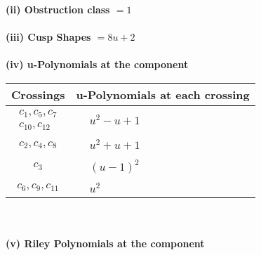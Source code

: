 \documentclass[1p]{elsarticle_modified}
\theoremstyle{definition}
\begin{document}
\flushleft \textbf{(ii) Obstruction class $= 1$}\\~\\
\flushleft \textbf{(iii) Cusp Shapes $= 8 u+2$}\\~\\
\newpage\renewcommand{\arraystretch}{1}
\flushleft \textbf{(iv) u-Polynomials at the component}\newline \\
\begin{tabular}{m{50pt}|m{274pt}}
Crossings & \hspace{64pt}u-Polynomials at each crossing \\
\hline $$\begin{aligned}c_{1},c_{5},c_{7}\\c_{10},c_{12}\end{aligned}$$&$\begin{aligned}
&u^2- u+1
\end{aligned}$\\
\hline $$\begin{aligned}c_{2},c_{4},c_{8}\end{aligned}$$&$\begin{aligned}
&u^2+u+1
\end{aligned}$\\
\hline $$\begin{aligned}c_{3}\end{aligned}$$&$\begin{aligned}
&(u-1)^2
\end{aligned}$\\
\hline $$\begin{aligned}c_{6},c_{9},c_{11}\end{aligned}$$&$\begin{aligned}
&u^2
\end{aligned}$\\
\hline
\end{tabular}\\~\\
\newpage\renewcommand{\arraystretch}{1}
\flushleft \textbf{(v) Riley Polynomials at the component}\newline \\
\end{document}
